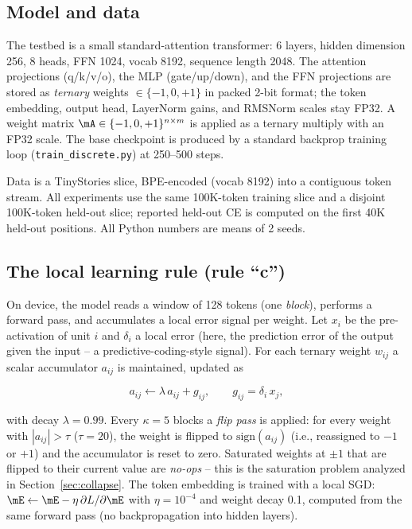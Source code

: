 \documentclass{article} %
\begin{document}
\subsection{Model and data}
\label{sec:model}

The testbed is a small standard-attention transformer: 6 layers, hidden dimension 256, 8 heads, FFN 1024, vocab 8192, sequence length 2048. The attention projections (q/k/v/o), the MLP (gate/up/down), and the FFN projections are stored as \emph{ternary} weights $\in\{-1,0,+1\}$ in packed 2-bit format; the token embedding, output head, LayerNorm gains, and RMSNorm scales stay FP32. A weight matrix $\mA \in \{ -1,0,+1 \}^{n\times m}$ is applied as a ternary multiply with an FP32 scale. The base checkpoint is produced by a standard backprop training loop (\texttt{train\_discrete.py}) at 250--500 steps.

Data is a TinyStories slice, BPE-encoded (vocab 8192) into a contiguous token stream. All experiments use the same 100K-token training slice and a disjoint 100K-token held-out slice; reported held-out CE is computed on the first 40K held-out positions. All Python numbers are means of 2 seeds.

\subsection{The local learning rule (rule ``c'')}
\label{sec:rule}

On device, the model reads a window of 128 tokens (one \emph{block}), performs a forward pass, and accumulates a local error signal per weight. Let $x_i$ be the pre-activation of unit $i$ and $\delta_i$ a local error (here, the prediction error of the output given the input -- a predictive-coding-style signal). For each ternary weight $w_{ij}$ a scalar accumulator $a_{ij}$ is maintained, updated as

\begin{equation}
a_{ij} \leftarrow \lambda\, a_{ij} + g_{ij}, \qquad g_{ij} = \delta_i\, x_j,
\label{eq:acc}
\end{equation}

with decay $\lambda=0.99$. Every $\kappa=5$ blocks a \emph{flip pass} is applied: for every weight with $|a_{ij}| > \tau$ ($\tau=20$), the weight is flipped to $\text{sign}(a_{ij})$ (i.e., reassigned to $-1$ or $+1$) and the accumulator is reset to zero. Saturated weights at $\pm 1$ that are flipped to their current value are \emph{no-ops} -- this is the saturation problem analyzed in Section~\ref{sec:collapse}. The token embedding is trained with a local SGD: $\mE \leftarrow \mE - \eta\, \partial L / \partial \mE$ with $\eta=10^{-4}$ and weight decay 0.1, computed from the same forward pass (no backpropagation into hidden layers).
\end{document}
